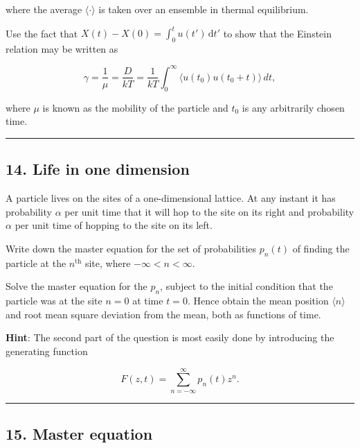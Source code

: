 \documentclass[
  letterpaper,
  DIV=11,
  numbers=noendperiod]{scrreprt}
\begin{document}
where the average \(\langle \cdot \rangle\) is taken over an ensemble in
thermal equilibrium.

Use the fact that \(X(t) - X(0)
= \int_{0}^{t} u(t')\,\mathrm{d}t'\) to show that the Einstein relation
may be written as

\[
\gamma = \frac{1}{\mu} = \frac{D}{kT} = \frac{1}{kT} \int_0^\infty \langle u(t_0) u(t_0 + t) \rangle \, dt,
\]

where \(\mu\) is known as the mobility of the particle and \(t_0\) is
any arbitrarily chosen time.

\begin{center}\rule{0.5\linewidth}{0.5pt}\end{center}

\subsection*{14. Life in one dimension}\label{life-in-one-dimension}

A particle lives on the sites of a one-dimensional lattice. At any
instant it has probability \(\alpha\) per unit time that it will hop to
the site on its right and probability \(\alpha\) per unit time of
hopping to the site on its left.

Write down the master equation for the set of probabilities \(p_n(t)\)
of finding the particle at the \(n^{\text{th}}\) site, where
\(-\infty < n < \infty\).

Solve the master equation for the \(p_n\), subject to the initial
condition that the particle was at the site \(n = 0\) at time \(t = 0\).
Hence obtain the mean position \(\langle n \rangle\) and root mean
square deviation from the mean, both as functions of time.

\textbf{Hint}: The second part of the question is most easily done by
introducing the generating function

\[
F(z, t) = \sum_{n=-\infty}^{\infty} p_n(t) z^n.
\]

\begin{center}\rule{0.5\linewidth}{0.5pt}\end{center}

\subsection*{15. Master equation}\label{master-equation}
\end{document}
